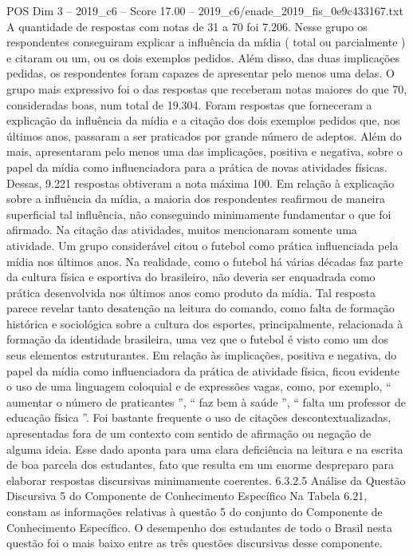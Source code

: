 \begin{textsample}{POS Dim 3 – 2019\_c6 – Score 17.00 – 2019\_c6/enade\_2019\_fis\_0e9c433167.txt}
A quantidade de respostas com notas de 31 a 70 foi 7.206.
Nesse grupo os respondentes conseguiram explicar a influência da mídia ( total ou parcialmente ) e citaram ou um, ou os dois exemplos pedidos.
Além disso, das duas implicações pedidas, os respondentes foram capazes de apresentar pelo menos uma delas.
O grupo mais expressivo foi o das respostas que receberam notas maiores do que 70, consideradas boas, num total de 19.304.
Foram respostas que forneceram a explicação da influência da mídia e a citação dos dois exemplos pedidos que, nos últimos anos, passaram a ser praticados por grande número de adeptos.
Além do mais, apresentaram pelo menos uma das implicações, positiva e negativa, sobre o papel da mídia como influenciadora para a prática de novas atividades físicas.
Dessas, 9.221 respostas obtiveram a nota máxima 100.
Em relação à explicação sobre a influência da mídia, a maioria dos respondentes reafirmou de maneira superficial tal influência, não conseguindo minimamente fundamentar o que foi afirmado.
Na citação das atividades, muitos mencionaram somente uma atividade.
Um grupo considerável citou o futebol como prática influenciada pela mídia nos últimos anos.
Na realidade, como o futebol há várias décadas faz parte da cultura física e esportiva do brasileiro, não deveria ser enquadrada como prática desenvolvida nos últimos anos como produto da mídia.
Tal resposta parece revelar tanto desatenção na leitura do comando, como falta de formação histórica e sociológica sobre a cultura dos esportes, principalmente, relacionada à formação da identidade brasileira, uma vez que o futebol é visto como um dos seus elementos estruturantes.
Em relação às implicações, positiva e negativa, do papel da mídia como influenciadora da prática de atividade física, ficou evidente o uso de uma linguagem coloquial e de expressões vagas, como, por exemplo, “ aumentar o número de praticantes ”, “ faz bem à saúde ”, “ falta um professor de educação física ”.
Foi bastante frequente o uso de citações descontextualizadas, apresentadas fora de um contexto com sentido de afirmação ou negação de alguma ideia.
Esse dado aponta para uma clara deficiência na leitura e na escrita de boa parcela dos estudantes, fato que resulta em um enorme despreparo para elaborar respostas discursivas minimamente coerentes. 6.3.2.5 Análise da Questão Discursiva 5 do Componente de Conhecimento Específico Na Tabela 6.21, constam as informações relativas à questão 5 do conjunto do Componente de Conhecimento Específico.
O desempenho dos estudantes de todo o Brasil nesta questão foi o mais baixo entre as três questões discursivas desse componente.

\end{textsample}
